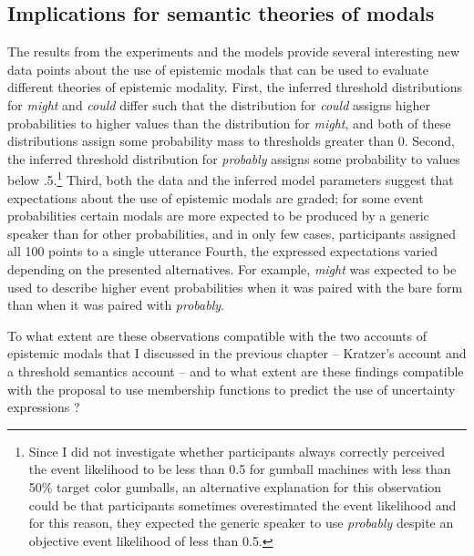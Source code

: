 \subsection{Implications for semantic theories of modals}
\label{subsec:discussion-sem-theories}

The results from the experiments and the models provide several interesting new data points about the use
of epistemic modals that can be used to evaluate different theories of epistemic modality. First, the inferred threshold 
distributions for \textit{might} and \textit{could} differ such that the distribution for \textit{could} assigns higher probabilities 
to higher values than the distribution for \textit{might}, and both of these distributions assign some probability mass to thresholds
greater than 0. Second, the inferred threshold distribution
for \textit{probably} assigns some probability to values below .5.\footnote{Since I did not investigate whether participants always correctly perceived the event likelihood to be less than 0.5 for gumball machines with less than 50\% target color gumballs, an alternative explanation for this observation could be that participants sometimes overestimated the event likelihood and for this reason, they expected the generic speaker to use \textit{probably} despite an objective event likelihood of less than 0.5.} Third, both the data
and the inferred model parameters suggest that expectations about the use of epistemic modals are graded; for some
event probabilities certain modals are more expected to be produced by a generic speaker than for other probabilities,
and in only few cases, participants assigned all 100 points to a single utterance Fourth, the expressed expectations varied 
depending on the presented alternatives. For example, \textit{might} was expected to be used to describe higher event probabilities 
when it was paired with the bare form than when it was paired with
\textit{probably}.


 To what extent are these observations compatible with the two accounts of epistemic modals that I discussed in the previous chapter -- Kratzer's \cite{Kratzer2012}
account and a threshold semantics account \cite{Lassiter2016,Swanson2006,Yalcin2010} -- and to what extent are these findings 
compatible with the proposal to use membership functions to predict the use of uncertainty expressions \cite{Wallsten1986}?

